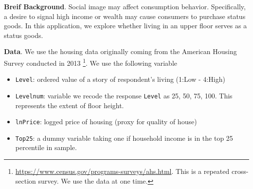 \documentclass[
  12pt,
]{article}
\newenvironment{Shaded}{\begin{snugshade}}{\end{snugshade}}
\newcommand{\DataTypeTok}[1]{\textcolor[rgb]{0.13,0.29,0.53}{#1}}
\newcommand{\DecValTok}[1]{\textcolor[rgb]{0.00,0.00,0.81}{#1}}
\newcommand{\KeywordTok}[1]{\textcolor[rgb]{0.13,0.29,0.53}{\textbf{#1}}}
\newcommand{\NormalTok}[1]{#1}
\newcommand{\OperatorTok}[1]{\textcolor[rgb]{0.81,0.36,0.00}{\textbf{#1}}}
\newcommand{\OtherTok}[1]{\textcolor[rgb]{0.56,0.35,0.01}{#1}}
\newcommand{\StringTok}[1]{\textcolor[rgb]{0.31,0.60,0.02}{#1}}
\providecommand{\tightlist}{%
  \setlength{\itemsep}{0pt}\setlength{\parskip}{0pt}}
\begin{document}
\textbf{Breif Background}. Social image may affect consumption behavior.
Specifically, a desire to signal high income or wealth may cause
consumers to purchase status goods. In this application, we explore
whether living in an upper floor serves as a status goods.

\noindent \textbf{Data}. We use the housing data originally coming from
the American Housing Survey conducted in 2013 \footnote{\url{https://www.census.gov/programs-surveys/ahs.html}.
  This is a repeated cross-section survey. We use the data at one time.}.
We use the following variable

\begin{itemize}
\tightlist
\item
  \texttt{Level}: ordered value of a story of respondent's living (1:Low
  - 4:High)
\item
  \texttt{Levelnum}: variable we recode the response \texttt{Level} as
  25, 50, 75, 100. This represents the extent of floor height.
\item
  \texttt{lnPrice}: logged price of housing (proxy for quality of house)
\item
  \texttt{Top25}: a dummy variable taking one if household income is in
  the top 25 percentile in sample.
\end{itemize}

\begin{Shaded}
\end{Shaded}
\end{document}
